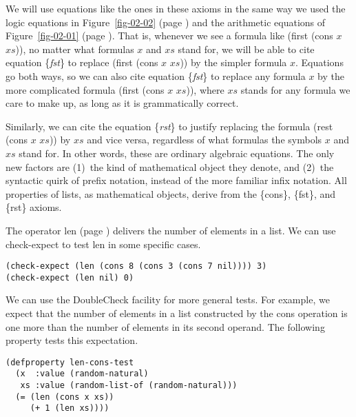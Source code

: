 We will use equations like the ones in these axioms in the
same way we used the logic equations in Figure~\ref{fig-02-02}
(page \pageref{fig-02-02}) and the arithmetic equations of
Figure~\ref{fig-02-01} (page \pageref{fig-02-01}).
That is, whenever we see a formula like \textsf{(first (cons $x$ $xs$))},
no matter what formulas $x$ and $xs$ stand for,
we will be able to cite equation \{\emph{fst}\} to replace
\textsf{(first (cons $x$ $xs$))} by the simpler formula $x$.
Equations go both ways, so we can also cite equation \{\emph{fst}\}
to replace any formula $x$ by the more complicated formula
\textsf{(first (cons $x$ $xs$))}, where $xs$ stands for any formula
we care to make up, as long as it is grammatically correct.

Similarly, we can cite the equation \{\emph{rst}\} to justify
replacing the formula \textsf{(rest (cons $x$ $xs$))} by $xs$
and vice versa, regardless of what formulas the symbols $x$ and $xs$ stand for.
In other words, these are ordinary algebraic equations.
The only new factors are
(1)~the kind of mathematical object they denote, and
(2)~the syntactic quirk of prefix notation, instead of the more familiar infix notation.
All properties of lists,
as mathematical objects,
derive from the \{cons\}, \{fst\}, and \{rst\} axioms.

The operator \textsf{len} (page \pageref{len-op-informal})
delivers the number of elements in a list.
We can use \textsf{check-expect} to test \textsf{len} in some specific cases.

\begin{code}
\begin{verbatim}
(check-expect (len (cons 8 (cons 3 (cons 7 nil)))) 3)
(check-expect (len nil) 0)
\end{verbatim}
\end{code}


We can use the DoubleCheck facility for more general tests.
For example, we expect that the number of elements
in a list constructed by the \textsf{cons} operation is
one more than the number of elements in its second operand.
The following property tests this expectation.

\begin{code}
\begin{verbatim}
(defproperty len-cons-test
  (x  :value (random-natural)
   xs :value (random-list-of (random-natural)))
  (= (len (cons x xs))
     (+ 1 (len xs))))
\end{verbatim}
\end{code}

